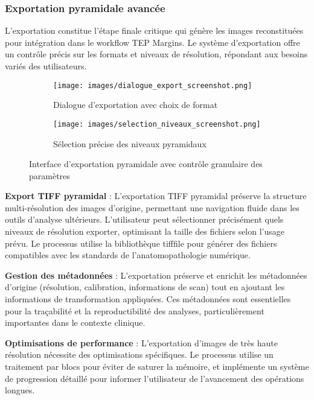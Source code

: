 \subsubsection{Exportation pyramidale avancée}

L'exportation constitue l'étape finale critique qui génère les images reconstituées pour intégration dans le workflow TEP Margins. Le système d'exportation offre un contrôle précis sur les formats et niveaux de résolution, répondant aux besoins variés des utilisateurs.

\begin{figure}[H]
\centering
\begin{subfigure}{0.48\textwidth}
\texttt{[image: images/dialogue\_export\_screenshot.png]}
\caption{Dialogue d'exportation avec choix de format}
\end{subfigure}
\hfill
\begin{subfigure}{0.48\textwidth}
\texttt{[image: images/selection\_niveaux\_screenshot.png]}
\caption{Sélection précise des niveaux pyramidaux}
\end{subfigure}
\caption{Interface d'exportation pyramidale avec contrôle granulaire des paramètres}
\label{fig:export_pyramidal}
\end{figure}

\textbf{Export TIFF pyramidal} : L'exportation TIFF pyramidal préserve la structure multi-résolution des images d'origine, permettant une navigation fluide dans les outils d'analyse ultérieurs. L'utilisateur peut sélectionner précisément quels niveaux de résolution exporter, optimisant la taille des fichiers selon l'usage prévu. Le processus utilise la bibliothèque tifffile pour générer des fichiers compatibles avec les standards de l'anatomopathologie numérique.

\textbf{Gestion des métadonnées} : L'exportation préserve et enrichit les métadonnées d'origine (résolution, calibration, informations de scan) tout en ajoutant les informations de transformation appliquées. Ces métadonnées sont essentielles pour la traçabilité et la reproductibilité des analyses, particulièrement importantes dans le contexte clinique.

\textbf{Optimisations de performance} : L'exportation d'images de très haute résolution nécessite des optimisations spécifiques. Le processus utilise un traitement par blocs pour éviter de saturer la mémoire, et implémente un système de progression détaillé pour informer l'utilisateur de l'avancement des opérations longues.
